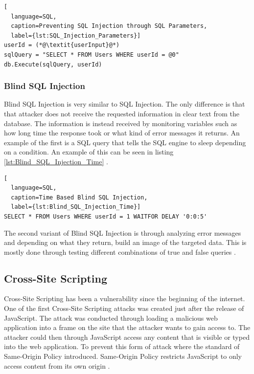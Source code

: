 \hfill
\begin{lstlisting}[
  language=SQL,
  caption=Preventing SQL Injection through SQL Parameters,
  label={lst:SQL_Injection_Parameters}]
userId = (*@\textit{userInput}@*)
sqlQuery = "SELECT * FROM Users WHERE userId = @0"
db.Execute(sqlQuery, userId)
\end{lstlisting}



\subsubsection{Blind SQL Injection}
Blind SQL Injection is very similar to SQL Injection. The only difference is that that attacker does not receive the requested information in clear text from the database. The information is instead received by monitoring variables such as how long time the response took or what kind of error messages it returns. An example of the first is a SQL query that tells the SQL engine to sleep depending on a condition. An example of this can be seen in listing \ref{lst:Blind_SQL_Injection_Time} \parencite{JustinClarke-Salt2009SIAa, Secure_Web}.

\hfill
\begin{lstlisting}[
  language=SQL,
  caption=Time Based Blind SQL Injection,
  label={lst:Blind_SQL_Injection_Time}]
SELECT * FROM Users WHERE userId = 1 WAITFOR DELAY '0:0:5'
\end{lstlisting}
\hfill

The second variant of Blind SQL Injection is through analyzing error messages and depending on what they return, build an image of the targeted data. This is mostly done through testing different combinations of true and false queries \parencite{JustinClarke-Salt2009SIAa, Secure_Web}.



\subsection{Cross-Site Scripting}
Cross-Site Scripting has been a vulnerability since the beginning of the internet. One of the first Cross-Site Scripting attacks was created just after the release of JavaScript. The attack was conducted through loading a malicious web application into a frame on the site that the attacker wants to gain access to. The attacker could then through JavaScript access any content that is visible or typed into the web application. To prevent this form of attack where the standard of Same-Origin Policy introduced. Same-Origin Policy restricts JavaScript to only access content from its own origin \parencite{FogieSeth2007Xacs, w3csop}.

